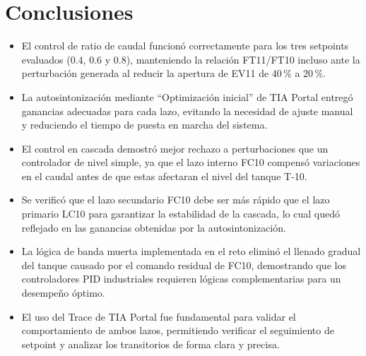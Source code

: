 \section{Conclusiones}

\begin{itemize}

    \item El control de ratio de caudal funcionó correctamente para los tres
    setpoints evaluados (0.4, 0.6 y 0.8), manteniendo la relación FT11/FT10
    incluso ante la perturbación generada al reducir la apertura de EV11
    de 40\,\% a 20\,\%.

    \item La autosintonización mediante ``Optimización inicial'' de TIA Portal
    entregó ganancias adecuadas para cada lazo, evitando la necesidad de
    ajuste manual y reduciendo el tiempo de puesta en marcha del sistema.

    \item El control en cascada demostró mejor rechazo a perturbaciones que un
    controlador de nivel simple, ya que el lazo interno FC10 compensó
    variaciones en el caudal antes de que estas afectaran el nivel del
    tanque T-10.

    \item Se verificó que el lazo secundario FC10 debe ser más rápido que el
    lazo primario LC10 para garantizar la estabilidad de la cascada, lo cual
    quedó reflejado en las ganancias obtenidas por la autosintonización.

    \item La lógica de banda muerta implementada en el reto eliminó el llenado
    gradual del tanque causado por el comando residual de FC10, demostrando
    que los controladores PID industriales requieren lógicas complementarias
    para un desempeño óptimo.

    \item El uso del Trace de TIA Portal fue fundamental para validar el
    comportamiento de ambos lazos, permitiendo verificar el seguimiento de
    setpoint y analizar los transitorios de forma clara y precisa.

\end{itemize}